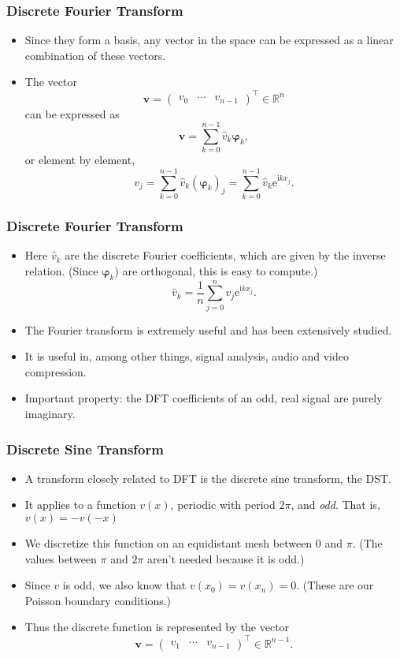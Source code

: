 \begin{frame}
  \frametitle{Discrete Fourier Transform}
  \begin{itemize}
  \item Since they form a basis, any vector in the space can be expressed as a
    linear combination of these vectors.
  \item The vector
    \[
      \bm v = \begin{pmatrix} v_0 & \cdots & v_{n-1} \end{pmatrix}^\intercal \in
      \mathbb{R}^n
    \]
    can be expressed as
    \[
      \bm v = \sum_{k=0}^{n-1} \hat{v}_k \bm \varphi_k,
    \]
    or element by element,
    \[
      v_j = \sum_{k=0}^{n-1} \hat{v}_k (\bm \varphi_k)_j
      = \sum_{k=0}^{n-1} \hat{v}_k \text{e}^{\text{i}kx_j}.
    \]
  \end{itemize}
\end{frame}

\begin{frame}
  \frametitle{Discrete Fourier Transform}
  \begin{itemize}
  \item Here $\hat{v}_k$ are the discrete Fourier coefficients, which are given
    by the inverse relation. (Since $\bm \varphi_k$) are orthogonal, this is
    easy to compute.)
    \[
      \hat{v}_k = \frac{1}{n} \sum_{j=0}^n v_j \text{e}^{\text{i}kx_j}.
    \]
  \item The Fourier transform is extremely useful and has been extensively
    studied.
  \item It is useful in, among other things, signal analysis, audio and video
    compression.
  \item Important property: the DFT coefficients of an odd, real signal are
    purely imaginary.
  \end{itemize}
\end{frame}

\begin{frame}
  \frametitle{Discrete Sine Transform}
  \begin{itemize}
  \item A transform closely related to DFT is the discrete sine transform, the
    DST.
  \item It applies to a function $v(x)$, periodic with period $2\pi$, and
    \emph{odd}. That is, $v(x) = -v(-x)$
  \item We discretize this function on an equidistant mesh between 0 and $\pi$.
    (The values between $\pi$ and $2\pi$ aren't needed because it is odd.)
  \item Since $v$ is odd, we also know that $v(x_0) = v(x_n) = 0$. (These are
    our Poisson boundary conditions.)
  \item Thus the discrete function is represented by the vector
    \[
      \bm v = \begin{pmatrix} v_1 & \cdots & v_{n-1} \end{pmatrix}^\intercal
      \in \mathbb{R}^{n-1}.
    \]
  \end{itemize}
\end{frame}

